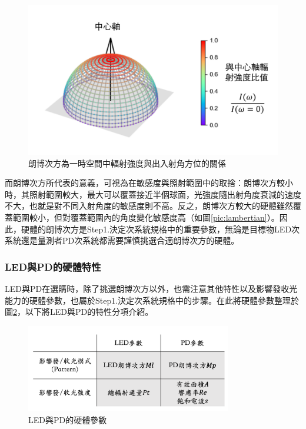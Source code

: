         

        \begin{figure}[htpb]
            \centering
            \includegraphics[width=12cm]{ch2pic/lambertian_3d.png}
            \caption{朗博次方為一時空間中輻射強度與出入射角方位的關係}
            \label{pic:lambertian_3d}
        \end{figure}

        而朗博次方所代表的意義，可視為在敏感度與照射範圍中的取捨：朗博次方較小時，其照射範圍較大，最大可以覆蓋接近半個球面，光強度隨出射角度衰減的速度不大，也就是對不同入射角度的敏感度則不高。反之，朗博次方較大的硬體雖然覆蓋範圍較小，但對覆蓋範圍內的角度變化敏感度高（如圖\ref{pic:lambertian}）。因此，硬體的朗博次方是Step1.決定次系統規格中的重要參數，無論是目標物LED次系統還是量測者PD次系統都需要謹慎挑選合適朗博次方的硬體。
        
    \subsubsection{LED與PD的硬體特性}
            \label{chp:LEDPD_hardware}

            LED與PD在選購時，除了挑選朗博次方以外，也需注意其他特性以及影響發收光能力的硬體參數，也屬於Step1.決定次系統規格中的步驟。在此將硬體參數整理於圖\ref{pic:hardware_para}，以下將LED與PD的特性分項介紹。
            
            \begin{figure}[htpb]
                \centering
                \includegraphics[width=9cm]{ch2pic/hardware_para.png}
                \caption{LED與PD的硬體參數}
                \label{pic:hardware_para}
            \end{figure}

